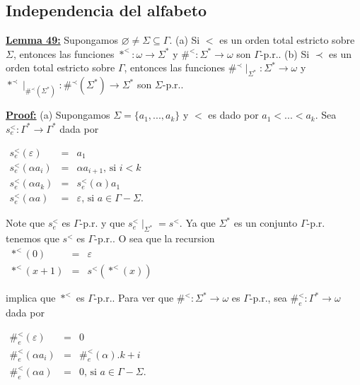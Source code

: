\subsection{Independencia del alfabeto}

\textbf{\underline{Lemma 49:}} Supongamos \(\varnothing \neq \Sigma \subseteq \Gamma \).
(a) Si \(< \) es un orden total estricto sobre \(\Sigma \), entonces las funciones \(\ast ^{< }:\omega \rightarrow \Sigma ^{\ast }\) y \(\#^{< }:\Sigma ^{\ast }\rightarrow \omega \) son \(\Gamma \)-p.r..
(b) Si \(\prec \) es un orden total estricto sobre \(\Gamma \), entonces las funciones \(\#^{\prec }\mid _{\Sigma ^{\ast }}:\Sigma ^{\ast }\rightarrow \omega \) y \(\ast ^{\prec }\mid _{\#^{\prec }(\Sigma ^{\ast })}:\#^{\prec }(\Sigma ^{\ast })\rightarrow \Sigma ^{\ast }\) son \(\Sigma \)-p.r..

\textbf{\underline{Proof:}} (a) Supongamos \(\Sigma =\{a_{1},...,a_{k}\}\) y \(< \) es dado por \( a_{1}< ...< a_{k}\). Sea \(s_{e}^{< }:\Gamma ^{\ast }\rightarrow \Gamma ^{\ast }\) dada por

\(\displaystyle \begin{array}{rcl} s_{e}^{< }(\varepsilon ) & =& a_{1} \\ s_{e}^{< }(\alpha a_{i}) & =& \alpha a_{i+1}\text{, si }i< k \\ s_{e}^{< }(\alpha a_{k}) & =& s_{e}^{< }(\alpha )a_{1} \\ s_{e}^{< }(\alpha a) & =& \varepsilon \text{, si }a\in \Gamma -\Sigma . \end{array} \)

Note que \(s_{e}^{< }\) es \(\Gamma \)-p.r. y que \(s_{e}^{< }\mid _{\Sigma ^{\ast }}=s^{< }\). Ya que \(\Sigma ^{\ast }\) es un conjunto \(\Gamma \)-p.r. tenemos que \(s^{< }\) es \(\Gamma \)-p.r.. O sea que la recursion
\(\displaystyle \begin{array}{rcl} \ast ^{< }(0) & =& \varepsilon \\ \ast ^{< }(x+1) & =& s^{< }(\ast ^{< }(x)) \end{array} \)

implica que \(\ast ^{< }\) es \(\Gamma \)-p.r..
Para ver que \(\#^{< }:\Sigma ^{\ast }\rightarrow \omega \) es \(\Gamma \)-p.r., sea \(\#_{e}^{< }:\Gamma ^{\ast }\rightarrow \omega \) dada por

\(\displaystyle \begin{array}{rcl} \#_{e}^{< }(\varepsilon ) & =& 0 \\ \#_{e}^{< }(\alpha a_{i}) & =& \#_{e}^{< }(\alpha ).k+i \\ \#_{e}^{< }(\alpha a) & =& 0\text{, si }a\in \Gamma -\Sigma . \end{array} \)

